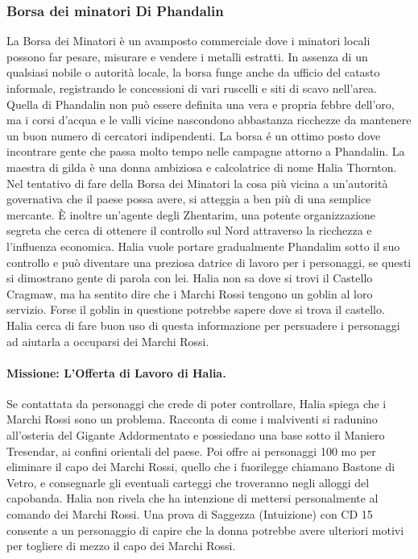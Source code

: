 \documentclass{article}
\begin{document}
\subsubsection{Borsa dei minatori Di Phandalin}
\hypertarget{borsa}{}
La Borsa dei Minatori è un avamposto commerciale dove
i minatori locali possono far pesare, misurare e vendere i
metalli estratti. In assenza di un qualsiasi nobile o autorità
locale, la borsa funge anche da ufficio del catasto informale,
registrando le concessioni di vari ruscelli e siti di scavo
nell’area. Quella di Phandalin non può essere definita una
vera e propria febbre dell'oro, ma i corsi d’acqua e le valli vicine nascondono abbastanza ricchezze da mantenere un
buon numero di cercatori indipendenti.
La borsa é un ottimo posto dove incontrare gente che passa
molto tempo nelle campagne attorno a Phandalin. La maestra
di gilda è una donna ambiziosa e calcolatrice di nome Halia
Thornton. Nel tentativo di fare della Borsa dei Minatori la
cosa più vicina a un'autorità governativa che il paese possa
avere, si atteggia a ben più di una semplice mercante. È
inoltre un'agente degli Zhentarim, una potente organizzazione
segreta che cerca di ottenere il controllo sul Nord attraverso
la ricchezza e l'influenza economica. Halia vuole portare
gradualmente Phandalim sotto il suo controllo e può diventare
una preziosa datrice di lavoro per i personaggi, se questi si
dimostrano gente di parola con lei.
Halia non sa dove si trovi il Castello Cragmaw, ma ha
sentito dire che i Marchi Rossi tengono un goblin al loro
servizio. Forse il goblin in questione potrebbe sapere dove
si trova il castello. Halia cerca di fare buon uso di questa
informazione per persuadere i personaggi ad aiutarla a
occuparsi dei Marchi Rossi.
\paragraph{Missione: L’Offerta di Lavoro di Halia.}Se contattata
da personaggi che crede di poter controllare, Halia spiega
che i Marchi Rossi sono un problema. Racconta di come i
malviventi si radunino all’osteria del Gigante Addormentato
e possiedano una base sotto il Maniero Tresendar, ai confini
orientali del paese. Poi offre ai personaggi 100 mo per
eliminare il capo dei Marchi Rossi, quello che i fuorilegge
chiamano Bastone di Vetro, e consegnarle gli eventuali
carteggi che troveranno negli alloggi del capobanda. Halia
non rivela che ha intenzione di mettersi personalmente
al comando dei Marchi Rossi. Una prova di Saggezza (Intuizione) con CD 15 consente a un personaggio di capire
che la donna potrebbe avere ulteriori motivi per togliere di
mezzo il capo dei Marchi Rossi.
\end{document}
